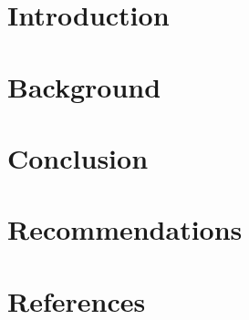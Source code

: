 
\section{Introduction}


\section{Background}



\section{Conclusion}


\section{Recommendations}


\br{}
\br{}
\br{}
\section{References}

